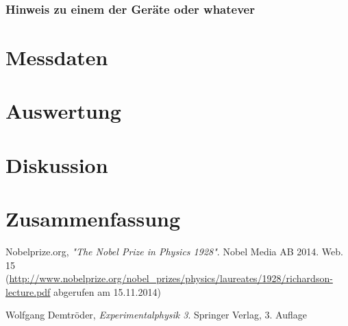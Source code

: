 \documentclass[11pt, a4paper]{article}
\begin{document}
\subsubsection{Hinweis zu einem der Geräte oder whatever}

\section{Messdaten}

\section{Auswertung}

\section{Diskussion}

\section{Zusammenfassung}


\begin{thebibliography}{9}

 Nobelprize.org,
 \emph{"The Nobel Prize in Physics 1928"}.
 Nobel Media AB 2014. Web. 15\\
 (\url{http://www.nobelprize.org/nobel_prizes/physics/laureates/1928/richardson-lecture.pdf} abgerufen am 15.11.2014)
  
	Wolfgang Demtröder,
	\emph{Experimentalphysik 3}.
	Springer Verlag,
	3. Auflage
\end{thebibliography}

\newpage

\begin{appendix}

\end{appendix}
\end{document}
